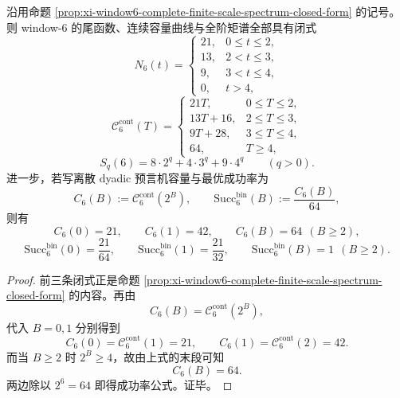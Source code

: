 \begin{theorem}\label{thm:xi-window6-oracle-geometry-completely-solvable}
沿用命题 \ref{prop:xi-window6-complete-finite-scale-spectrum-closed-form} 的记号。则 window-\(6\) 的尾函数、连续容量曲线与全阶矩谱全部具有闭式
\[
N_6(t)=
\begin{cases}
21,& 0\le t\le 2,\\
13,& 2<t\le 3,\\
9,& 3<t\le 4,\\
0,& t>4,
\end{cases}
\]
\[
\mathcal C_6^{\mathrm{cont}}(T)=
\begin{cases}
21T,& 0\le T\le 2,\\
13T+16,& 2\le T\le 3,\\
9T+28,& 3\le T\le 4,\\
64,& T\ge 4,
\end{cases}
\]
\[
S_q(6)=8\cdot 2^q+4\cdot 3^q+9\cdot 4^q
\qquad(q>0).
\]
进一步，若写离散 dyadic 预言机容量与最优成功率为
\[
C_6(B):=\mathcal C_6^{\mathrm{cont}}(2^B),
\qquad
\mathrm{Succ}_6^{\mathrm{bin}}(B):=\frac{C_6(B)}{64},
\]
则有
\[
\boxed{\;
C_6(0)=21,\qquad
C_6(1)=42,\qquad
C_6(B)=64\ \ (B\ge 2),\;}
\]
\[
\boxed{\;
\mathrm{Succ}_6^{\mathrm{bin}}(0)=\frac{21}{64},\qquad
\mathrm{Succ}_6^{\mathrm{bin}}(1)=\frac{21}{32},\qquad
\mathrm{Succ}_6^{\mathrm{bin}}(B)=1\ \ (B\ge 2).\;}
\]
\end{theorem}
\begin{proof}
前三条闭式正是命题 \ref{prop:xi-window6-complete-finite-scale-spectrum-closed-form} 的内容。再由
\[
C_6(B)=\mathcal C_6^{\mathrm{cont}}(2^B),
\]
代入 \(B=0,1\) 分别得到
\[
C_6(0)=\mathcal C_6^{\mathrm{cont}}(1)=21,
\qquad
C_6(1)=\mathcal C_6^{\mathrm{cont}}(2)=42.
\]
而当 \(B\ge 2\) 时 \(2^B\ge 4\)，故由上式的末段可知
\[
C_6(B)=64.
\]
两边除以 \(2^6=64\) 即得成功率公式。证毕。
\end{proof}





\endinput
